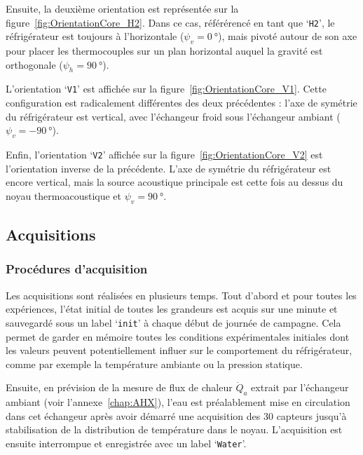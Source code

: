 Ensuite, la deuxième orientation est représentée sur la figure~\ref{fig:OrientationCore_H2}. Dans ce cas, référérencé en tant que `\texttt{H2}', le réfrigérateur est toujours à l'horizontale ($\psi_v=\qty{0}{\degree}$), mais pivoté autour de son axe pour placer les thermocouples sur un plan horizontal auquel la gravité est orthogonale ($\psi_h=\qty{90}{\degree}$).
\smallskip

L'orientation `\texttt{V1}' est affichée sur la figure~\ref{fig:OrientationCore_V1}. Cette configuration est radicalement différentes des deux précédentes : l'axe de symétrie du réfrigérateur est vertical, avec l'échangeur froid sous l'échangeur ambiant ($\psi_v=\qty{-90}{\degree}$).

Enfin, l'orientation `\texttt{V2}' affichée sur la figure~\ref{fig:OrientationCore_V2} est l'orientation inverse de la précédente. L'axe de symétrie du réfrigérateur est encore vertical, mais la source acoustique principale est cette fois au dessus du noyau thermoacoustique et $\psi_v=\qty{+90}{\degree}$.

\subsection{Acquisitions}
\subsubsection{Procédures d'acquisition}
Les acquisitions sont réalisées en plusieurs temps. Tout d'abord et pour toutes les expériences,  l'état initial de toutes les grandeurs est acquis sur une minute et sauvegardé sous un label `\texttt{init}' à chaque début de journée de campagne. Cela permet de garder en mémoire toutes les conditions expérimentales initiales dont les valeurs peuvent potentiellement influer sur le comportement du réfrigérateur, comme par exemple la température ambiante ou la pression statique. \medskip

Ensuite, en prévision de la mesure de flux de chaleur $\dot Q_a$ extrait par l'échangeur ambiant (voir l'annexe~\ref{chap:AHX}), l'eau est préalablement mise en circulation dans cet échangeur après avoir démarré une acquisition des 30 capteurs jusqu'à stabilisation de la distribution de température dans le noyau. L'acquisition est ensuite interrompue et enregistrée avec un label `\texttt{Water}'. \bigskip


